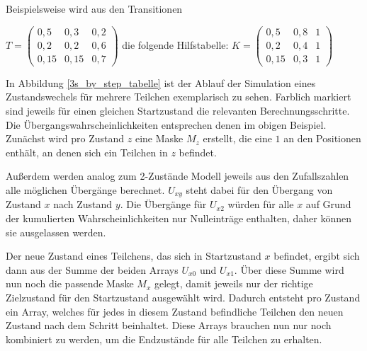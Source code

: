 Beispielsweise wird aus den Transitionen

$T= 
\begin{pmatrix}
0,5 & 0,3 & 0,2 \\
0,2 & 0,2 & 0,6 \\
0,15 & 0,15 & 0,7 
\end{pmatrix}
$ 
die folgende Hilfstabelle: 
$K= 
\begin{pmatrix}
0,5 & 0,8 & 1 \\
0,2 & 0,4 & 1 \\
0,15 & 0,3 & 1 
\end{pmatrix}
$ 

In Abbildung \ref{3s_by_step_tabelle} ist der Ablauf der Simulation eines Zustandswechels für mehrere Teilchen exemplarisch zu sehen. Farblich markiert sind jeweils für einen gleichen Startzustand die relevanten Berechnungsschritte. Die Übergangswahrscheinlichkeiten entsprechen denen im obigen Beispiel.
Zunächst wird pro Zustand $z$ eine Maske $M_z$ erstellt, die eine $1$ an den Positionen enthält, an denen sich ein Teilchen in $z$ befindet. 

Außerdem werden analog zum 2-Zustände Modell jeweils aus den Zufallszahlen alle möglichen Übergänge berechnet. $U_{xy}$ steht dabei für den Übergang von Zustand $x$ nach Zustand $y$. Die Übergänge für $U_{x2}$ würden für alle $x$ auf Grund der kumulierten Wahrscheinlichkeiten nur Nulleinträge enthalten, daher können sie ausgelassen werden. 

Der neue Zustand eines Teilchens, das sich in Startzustand $x$ befindet, ergibt sich dann aus der Summe der beiden Arrays $U_{x0}$ und $U_{x1}$. Über diese Summe wird nun noch die passende Maske $M_x$ gelegt, damit jeweils nur der richtige Zielzustand für den Startzustand ausgewählt wird.
Dadurch entsteht pro Zustand ein Array, welches für jedes in diesem Zustand befindliche Teilchen den neuen Zustand nach dem Schritt beinhaltet. Diese Arrays brauchen nun nur noch kombiniert zu werden, um die Endzustände für alle Teilchen zu erhalten.

